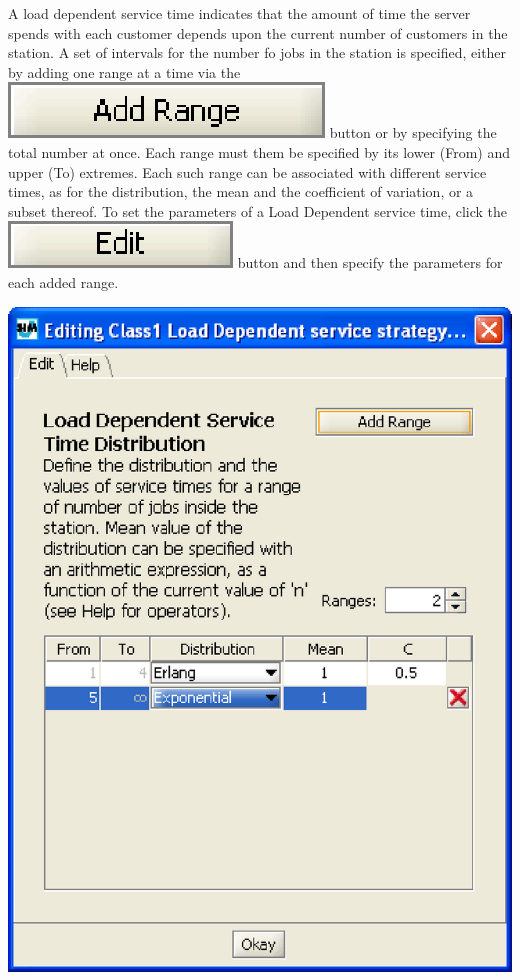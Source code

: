A load dependent service time indicates that the amount of time the server spends with each customer depends upon the current number of customers in the station. A set of intervals for the number fo jobs in the station is specified, either by adding one range at a time via the \includegraphics[scale=.5]{img/jsim/add_range.eps} button or by specifying the total number at once. Each range must them be specified by its lower (From) and upper (To) extremes. Each such range can be associated with different service times, as for the distribution, the mean and the coefficient of variation, or a subset thereof.
To set the parameters of a Load Dependent service time, click the \includegraphics[scale=.5]{img/jsim/edit.eps} button and then specify the parameters for each added range.
\begin{center}
\includegraphics[scale=.5]{img/jsim/load_dipendent.eps}
\end{center}
